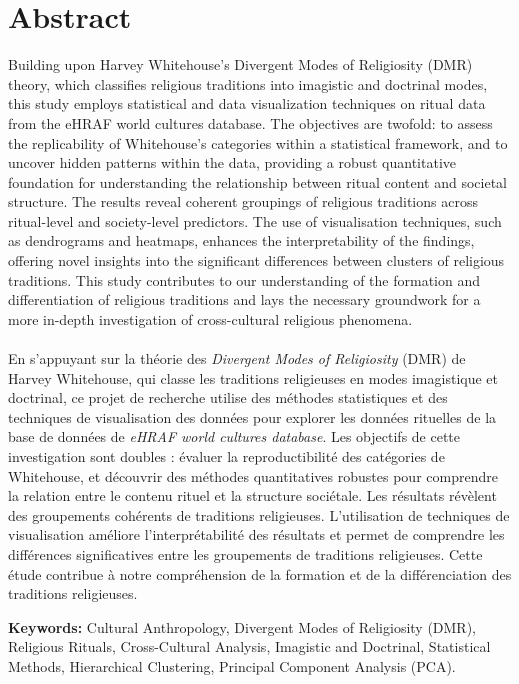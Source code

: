 \documentclass[12pt]{report}
\begin{document}
	\chapter*{Abstract}
	Building upon Harvey Whitehouse's Divergent Modes of Religiosity (DMR) theory, which classifies religious traditions into imagistic and doctrinal modes, this study employs statistical and data visualization techniques on ritual data from the eHRAF world cultures database. The objectives are twofold: to assess the replicability of Whitehouse's categories within a statistical framework, and to uncover hidden patterns within the data, providing a robust quantitative foundation for understanding the relationship between ritual content and societal structure. The results reveal coherent groupings of religious traditions across ritual-level and society-level predictors. The use of visualisation techniques, such as dendrograms and heatmaps, enhances the interpretability of the findings, offering novel insights into the significant differences between clusters of religious traditions. This study contributes to our understanding of the formation and differentiation of religious traditions and lays the necessary groundwork for a more in-depth investigation of cross-cultural religious phenomena.\\
	\\
	\noindent En s'appuyant sur la théorie des \textit{Divergent Modes of Religiosity} (DMR) de Harvey Whitehouse, qui classe les traditions religieuses en modes imagistique et doctrinal, ce projet de recherche utilise des méthodes statistiques et des techniques de visualisation des données pour explorer les données rituelles de la base de données de \textit{eHRAF world cultures database}. Les objectifs de cette investigation sont doubles : évaluer la reproductibilité des catégories de Whitehouse, et découvrir des méthodes quantitatives robustes pour comprendre la relation entre le contenu rituel et la structure sociétale. Les résultats révèlent des groupements cohérents de traditions religieuses. L'utilisation de techniques de visualisation améliore l'interprétabilité des résultats et permet de comprendre les différences significatives entre les groupements de traditions religieuses. Cette étude contribue à notre compréhension de la formation et de la différenciation des traditions religieuses.
	
	\vspace{0.5cm}
	\noindent\textbf{Keywords:} Cultural Anthropology, Divergent Modes of Religiosity (DMR), Religious Rituals, Cross-Cultural Analysis, Imagistic and Doctrinal, Statistical Methods, Hierarchical Clustering, Principal Component Analysis (PCA).
	
\end{document}
